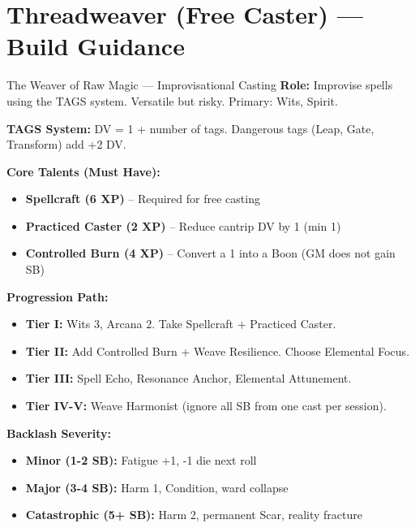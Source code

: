 \documentclass[10pt]{article}
\begin{document}
\newpage


\section*{Threadweaver (Free Caster) --- Build Guidance}

\begin{tipbox}{The Weaver of Raw Magic --- Improvisational Casting}
    \textbf{Role:} Improvise spells using the TAGS system. Versatile but risky. Primary: Wits, Spirit.
    
    \textbf{TAGS System:} DV = 1 + number of tags. Dangerous tags (Leap, Gate, Transform) add +2 DV.
    
    \textbf{Core Talents (Must Have):}
    \begin{itemize}
        \item \textbf{Spellcraft (6 XP)} -- Required for free casting
        \item \textbf{Practiced Caster (2 XP)} -- Reduce cantrip DV by 1 (min 1)
        \item \textbf{Controlled Burn (4 XP)} -- Convert a 1 into a Boon (GM does not gain SB)
    \end{itemize}
    
    \textbf{Progression Path:}
    \begin{itemize}
        \item \textbf{Tier I:} Wits 3, Arcana 2. Take Spellcraft + Practiced Caster.
        \item \textbf{Tier II:} Add Controlled Burn + Weave Resilience. Choose Elemental Focus.
        \item \textbf{Tier III:} Spell Echo, Resonance Anchor, Elemental Attunement.
        \item \textbf{Tier IV-V:} Weave Harmonist (ignore all SB from one cast per session).
    \end{itemize}
    
    \textbf{Backlash Severity:}
    \begin{itemize}
        \item \textbf{Minor (1-2 SB):} Fatigue +1, -1 die next roll
        \item \textbf{Major (3-4 SB):} Harm 1, Condition, ward collapse
        \item \textbf{Catastrophic (5+ SB):} Harm 2, permanent Scar, reality fracture
    \end{itemize}
\end{tipbox}
\end{document}
